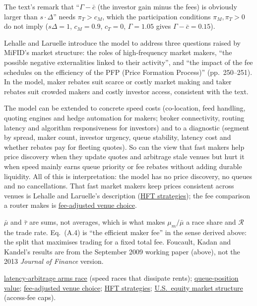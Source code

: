\begin{qfmodel}
The text's remark that ``$\Gamma-\bar c$ (the investor gain minus the fees) is obviously larger than $s\cdot\Delta$'' needs $\pi_T>c_M$, which the participation conditions $\pi_M,\pi_T>0$ do not imply ($s\Delta=1$, $c_M=0.9$, $c_T=0$, $\Gamma=1.05$ gives $\Gamma-\bar c=0.15$).

 Lehalle and Laruelle introduce the model to address three questions raised by MiFID's market structure: the roles of high-frequency market makers, ``the possible negative externalities linked to their activity'', and ``the impact of the fee schedules on the efficiency of the PFP (Price Formation Process)'' (pp.~250--251). In the model, maker rebates suit scarce or costly market making and taker rebates suit crowded makers and costly investor access, consistent with the text.

The model can be extended to concrete speed costs (co-location, feed handling, quoting engines and hedge automation for makers; broker connectivity, routing latency and algorithm responsiveness for investors) and to a diagnostic (segment by spread, maker count, investor urgency, queue stability, latency cost and whether rebates pay for fleeting quotes). So can the view that fast makers help price discovery when they update quotes and arbitrage stale venues but hurt it when speed mainly earns queue priority or fee rebates without adding durable liquidity. All of this is interpretation: the model has no price discovery, no queues and no cancellations. That fast market makers keep prices consistent across venues is Lehalle and Laruelle's description (\hyperref[def:hft-strategies]{HFT strategies}); the fee comparison a router makes is \hyperref[res:fee-adjusted-venue-choice]{fee-adjusted venue choice}.

 $\bar\mu$ and $\bar\tau$ are sums, not averages, which is what makes $\mu_m/\bar\mu$ a race share and $\mathcal R$ the trade rate. Eq.~(A.4) is ``the efficient maker fee'' in the sense derived above: the split that maximises trading for a fixed total fee. Foucault, Kadan and Kandel's results are from the September 2009 working paper (above), not the 2013 \emph{Journal of Finance} version.

 \hyperref[res:latency-arbitrage-arms-race]{latency-arbitrage arms race} (speed races that dissipate rents); \hyperref[res:queue-position-value]{queue-position value}; \hyperref[res:fee-adjusted-venue-choice]{fee-adjusted venue choice}; \hyperref[def:hft-strategies]{HFT strategies}; \hyperref[rule:us-equity-market-structure]{U.S.\ equity market structure} (access-fee caps).

\end{qfmodel}

